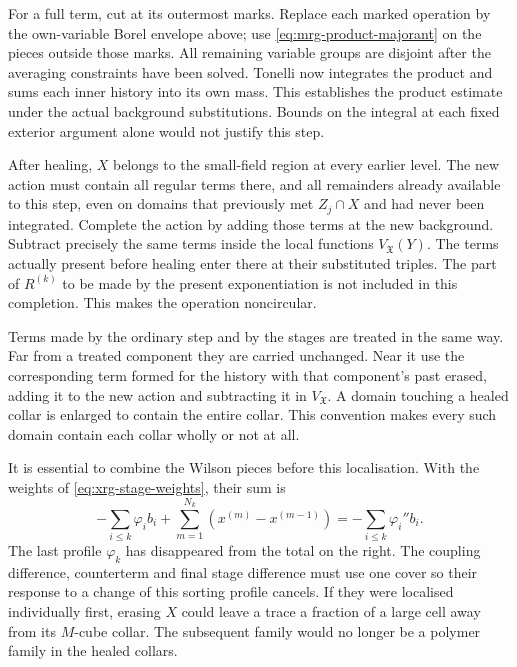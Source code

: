 \documentclass[11pt,letterpaper,reqno]{amsart}
\theoremstyle{definition}
\theoremstyle{remark}
\begin{document}
For a full term, cut at its outermost marks. Replace each marked
operation by the own-variable Borel envelope above; use
\eqref{eq:mrg-product-majorant} on the pieces outside those
marks. All remaining variable groups are disjoint after the
averaging constraints have been solved. Tonelli now integrates
the product and sums each inner history into its own mass.
This establishes the product estimate under the actual
background substitutions. Bounds on the integral at each fixed
exterior argument alone would not justify this step.

After healing, $X$ belongs to the small-field
region at every earlier level. The new action
must contain all regular terms there, and
all remainders already available to this
step, even on domains that previously met
$Z_j\cap X$ and had never been integrated.
Complete the action by adding those terms
at the new background. Subtract precisely
the same terms inside the local functions
$V_{\mathfrak X}(Y)$. The terms actually
present before healing enter there at
their substituted triples. The part of
$R^{(k)}$ to be made by the present
exponentiation is not included in this
completion. This makes the operation
noncircular.

Terms made by the ordinary step and by
the stages are treated in the same way.
Far from a treated component they are
carried unchanged. Near it use the
corresponding term formed for the history
with that component's past erased,
adding it to the new action and
subtracting it in $V_{\mathfrak X}$.
A domain touching a healed collar is
enlarged to contain the entire collar.
This convention makes every such domain
contain each collar wholly or not at all.

It is essential to combine the Wilson
pieces before this localisation.
With the weights of
\eqref{eq:xrg-stage-weights}, their sum is
\begin{equation}\label{eq:xrg-profile-cancellation}
 -\sum_{i\le k}\varphi_i b_i
     +\sum_{m=1}^{N_k}(x^{(m)}-x^{(m-1)})
                         =-\sum_{i\le k}\varphi_i''b_i.
\end{equation}
The last profile $\varphi_k$ has
disappeared from the total on the
right. The coupling difference,
counterterm and final stage difference
must use one cover so their response
to a change of this sorting profile
cancels. If they were localised
individually first, erasing $X$ could
leave a trace a fraction of a large
cell away from its $M$-cube collar.
The subsequent family would no longer
be a polymer family in the healed
collars.
\end{document}
